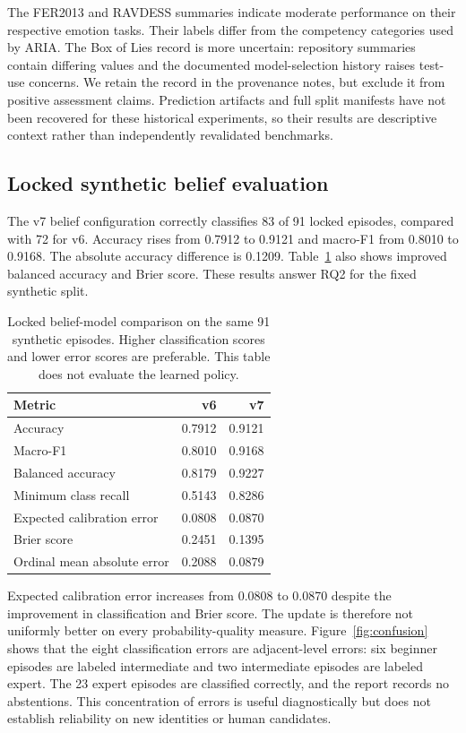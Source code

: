 \documentclass[10pt,a4paper]{article}
\begin{document}
The FER2013 and RAVDESS summaries indicate moderate performance on their respective emotion tasks. Their labels differ from the competency categories used by ARIA. The Box of Lies record is more uncertain: repository summaries contain differing values and the documented model-selection history raises test-use concerns. We retain the record in the provenance notes, but exclude it from positive assessment claims. Prediction artifacts and full split manifests have not been recovered for these historical experiments, so their results are descriptive context rather than independently revalidated benchmarks.

\subsection{Locked synthetic belief evaluation}
The v7 belief configuration correctly classifies 83 of 91 locked episodes, compared with 72 for v6. Accuracy rises from 0.7912 to 0.9121 and macro-F1 from 0.8010 to 0.9168. The absolute accuracy difference is 0.1209. Table~\ref{tab:locked} also shows improved balanced accuracy and Brier score. These results answer RQ2 for the fixed synthetic split.

\begin{table}[htbp]
\centering\small
\caption{Locked belief-model comparison on the same 91 synthetic episodes. Higher classification scores and lower error scores are preferable. This table does not evaluate the learned policy.}
\label{tab:locked}
\begin{tabularx}{\linewidth}{Xrr}
\toprule
Metric & v6 & v7 \\ \midrule
Accuracy & 0.7912 & 0.9121 \\
Macro-F1 & 0.8010 & 0.9168 \\
Balanced accuracy & 0.8179 & 0.9227 \\
Minimum class recall & 0.5143 & 0.8286 \\
Expected calibration error & 0.0808 & 0.0870 \\
Brier score & 0.2451 & 0.1395 \\
Ordinal mean absolute error & 0.2088 & 0.0879 \\
\bottomrule
\end{tabularx}
\end{table}

Expected calibration error increases from 0.0808 to 0.0870 despite the improvement in classification and Brier score. The update is therefore not uniformly better on every probability-quality measure. Figure~\ref{fig:confusion} shows that the eight classification errors are adjacent-level errors: six beginner episodes are labeled intermediate and two intermediate episodes are labeled expert. The 23 expert episodes are classified correctly, and the report records no abstentions. This concentration of errors is useful diagnostically but does not establish reliability on new identities or human candidates.
\end{document}
